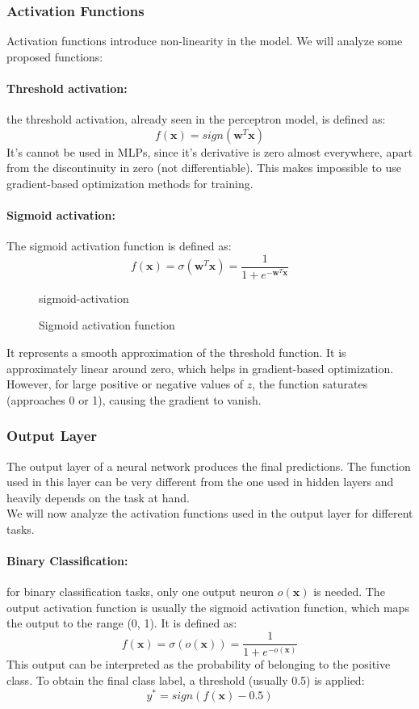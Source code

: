 \subsubsection{Activation Functions}
Activation functions introduce non-linearity in the model. We will analyze some proposed functions:

\paragraph{Threshold activation:}
the threshold activation, already seen in the perceptron model, is defined as:
\[ f(\boldsymbol{x}) = sign(\boldsymbol{w}^T \boldsymbol{x}) \]
It's cannot be used in MLPs, since it's derivative is zero almost everywhere, apart from the discontinuity in zero (not differentiable). 
This makes impossible to use gradient-based optimization methods for training.

\paragraph{Sigmoid activation:}
The sigmoid activation function is defined as:
\[ f(\boldsymbol{x}) = \sigma(\boldsymbol{w}^T \boldsymbol{x}) = \frac{1}{1 + e^{-\boldsymbol{w}^T \boldsymbol{x}}} \]
\begin{figure}[H]
    \centering
    {sigmoid-activation}
  \caption{Sigmoid activation function}
\end{figure}
It represents a smooth approximation of the threshold function. It is approximately linear around zero, which helps in gradient-based optimization.
However, for large positive or negative values of $z$, the function saturates (approaches 0 or 1), causing the gradient to vanish.

\subsubsection{Output Layer}
The output layer of a neural network produces the final predictions. The function used in this layer can be 
very different from the one used in hidden layers and heavily depends on the task at hand.
\\We will now analyze the activation functions used in the output layer for different tasks.
\paragraph{Binary Classification:} for binary classification tasks, only one output neuron $o(\boldsymbol{x})$ is needed.
The output activation function is usually the sigmoid activation function, which maps the output to the range (0, 1). 
It is defined as:
\[ f(\boldsymbol{x}) = \sigma(o(\boldsymbol{x})) = \frac{1}{1 + e^{-o(\boldsymbol{x})}} \]
This output can be interpreted as the probability of belonging to the positive class.
To obtain the final class label, a threshold (usually 0.5) is applied:
\[ y^* = sign(f(\boldsymbol{x}) - 0.5) \]

